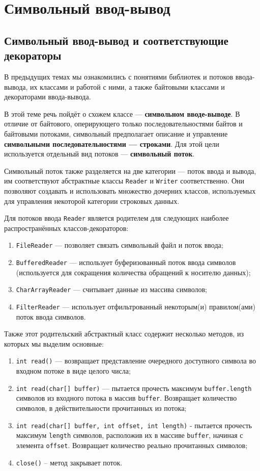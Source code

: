 \chapter{Символьный ввод-вывод}

\section{Символьный ввод-вывод и соответствующие декораторы}

В предыдущих темах мы ознакомились с понятиями библиотек и потоков ввода-вывода, их классами и работой с ними, а также байтовыми классами и декораторами ввода-вывода.

В этой теме речь пойдёт о схожем классе — \textbf{символьном вводе-выводе}. В отличие от байтового, оперирующего только последовательностями байтов и байтовыми потоками, символьный предполагает описание и управление \textbf{символьными последовательностями — строками}. Для этой цели используется отдельный вид потоков — \textbf{символьный поток}.

Символьный поток также разделяется на две категории — поток ввода и вывода, им соответствуют абстрактные классы \verb|Reader| и \verb|Writer| соответственно. Они позволяют создавать и использовать множество дочерних классов, используемых для управления некоторой категории строковых данных.

Для потоков ввода \verb|Reader| является родителем для следующих наиболее распространённых классов-декораторов:

\begin{enumerate}
    \item \verb|FileReader| — позволяет связать символьный файл и поток ввода;
    \item \verb|BufferedReader| — использует буферизованный поток ввода символов (используется для сокращения количества обращений к носителю данных);
    \item \verb|CharArrayReader| — считывает данные из массива символов;
    \item \verb|FilterReader| — использует отфильтрованный некоторым(и) правилом(ами) поток ввода символов.
\end{enumerate}

Также этот родительский абстрактный класс содержит несколько методов, из которых мы выделим основные:

\begin{enumerate}
    \item \verb|int read()| — возвращает представление очередного доступного символа во входном потоке в виде целого числа;
    \item \verb|int read(char[] buffer)| — пытается прочесть максимум \verb|buffer.length| символов из входного потока в массив \verb|buffer|. Возвращает количество символов, в действительности прочитанных из потока;
    \item \verb|int read(char[] buffer, int offset, int length)| - пытается прочесть максимум \verb|length| символов, расположив их в массиве \verb|buffer|, начиная с элемента \verb|offset|. Возвращает количество реально прочитанных символов;
    \item \verb|close()| – метод закрывает поток.
\end{enumerate}

